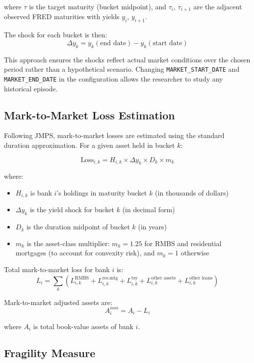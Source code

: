 \documentclass[12pt, a4paper]{article}
\begin{document}
where $\tau$ is the target maturity (bucket midpoint), and $\tau_i$, $\tau_{i+1}$
are the adjacent observed FRED maturities with yields $y_i$, $y_{i+1}$.

The shock for each bucket is then:
\[
    \Delta y_k = y_k(\text{end date}) - y_k(\text{start date})
\]

This approach ensures the shocks reflect actual market conditions over the chosen
period rather than a hypothetical scenario. Changing \texttt{MARKET\_START\_DATE}
and \texttt{MARKET\_END\_DATE} in the configuration allows the researcher to study
any historical episode.

\subsection{Mark-to-Market Loss Estimation}

Following JMPS, mark-to-market losses are estimated using the standard
duration approximation. For a given asset held in bucket $k$:

\[
    \text{Loss}_{i,k} = H_{i,k} \times \Delta y_k \times D_k \times m_k
\]

where:
\begin{itemize}[noitemsep]
    \item $H_{i,k}$ is bank $i$'s holdings in maturity bucket $k$ (in thousands of dollars)
    \item $\Delta y_k$ is the yield shock for bucket $k$ (in decimal form)
    \item $D_k$ is the duration midpoint of bucket $k$ (in years)
    \item $m_k$ is the asset-class multiplier: $m_k = 1.25$ for RMBS
    and residential mortgages (to account for convexity risk), and $m_k = 1$ otherwise
\end{itemize}

Total mark-to-market loss for bank $i$ is:
\[
    L_i = \sum_{k} \left(
        L^{\text{RMBS}}_{i,k} + L^{\text{res.mtg}}_{i,k} + L^{\text{tsy}}_{i,k}
        + L^{\text{other assets}}_{i,k} + L^{\text{other loans}}_{i,k}
    \right)
\]

Mark-to-market adjusted assets are:
\[
    A^{mm}_i = A_i - L_i
\]

where $A_i$ is total book-value assets of bank $i$.

\subsection{Fragility Measure}
\end{document}

